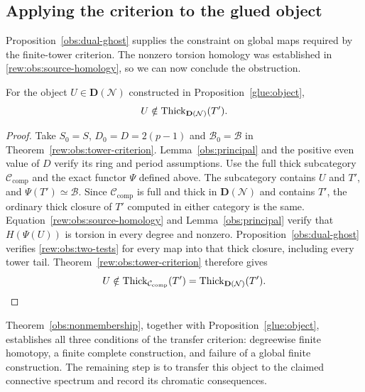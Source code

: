 \subsection{Applying the criterion to the glued object}

Proposition~\ref{obs:dual-ghost} supplies the constraint on global
maps required by the finite-tower criterion.  The nonzero torsion
homology was established in \eqref{rew:obs:source-homology}, so
we can now conclude the obstruction.

\begin{theorem}
\label{obs:nonmembership}
For the object $U\in\mathbf D(\mathcal N)$ constructed in
Proposition~\ref{glue:object},
\[
 U\notin\operatorname{Thick}_{\mathbf D(\mathcal N)}(T').
\]
\end{theorem}

\begin{proof}
Take $S_0=S$, $D_0=D=2(p-1)$ and $\mathscr B_0=\mathscr B$ in
Theorem~\ref{rew:obs:tower-criterion}.  Lemma~\ref{obs:principal}
and the positive even value of $D$ verify its ring and period
assumptions.  Use the full thick subcategory
$\mathcal C_{\mathrm{comp}}$ and the exact functor $\Psi$ defined
above.  The subcategory contains $U$ and $T'$, and
$\Psi(T')\simeq\mathscr B$.  Since
$\mathcal C_{\mathrm{comp}}$ is full and thick in
$\mathbf D(\mathcal N)$ and contains $T'$, the ordinary thick
closure of $T'$ computed in either category is the same.
Equation~\eqref{rew:obs:source-homology} and
Lemma~\ref{obs:principal} verify that $H(\Psi(U))$ is torsion
in every degree and nonzero.  Proposition~\ref{obs:dual-ghost}
verifies \eqref{rew:obs:two-tests} for every map into that thick
closure, including every tower tail.  Theorem~\ref{rew:obs:tower-criterion}
therefore gives
\[
 U\notin\operatorname{Thick}_{\mathcal C_{\mathrm{comp}}}(T')
   =\operatorname{Thick}_{\mathbf D(\mathcal N)}(T').
\]
\end{proof}

Theorem~\ref{obs:nonmembership}, together with
Proposition~\ref{glue:object}, establishes all three conditions
of the transfer criterion: degreewise finite homotopy, a finite
complete construction, and failure of a global finite construction.
The remaining step is to transfer this object to the claimed
connective spectrum and record its chromatic consequences.
